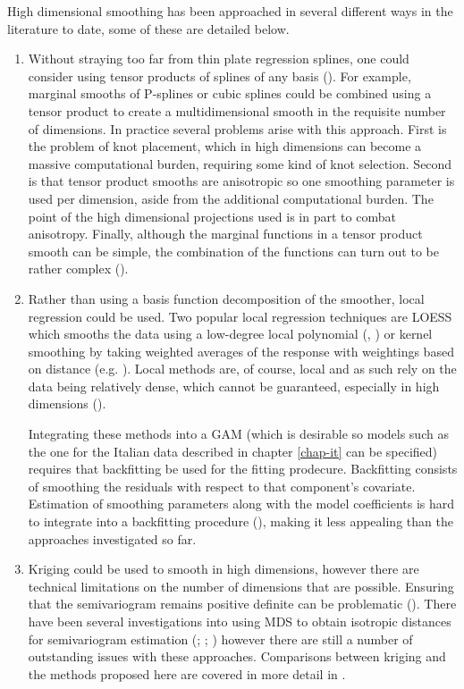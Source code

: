 High dimensional smoothing has been approached in several different ways in the literature to date, some of these are detailed below.
\begin{enumerate}
   \item Without straying too far from thin plate regression splines, one could consider using tensor products of splines of any basis (). For example, marginal smooths of P-splines or cubic splines could be combined using a tensor product to create a multidimensional smooth in the requisite number of dimensions. In practice several problems arise with this approach. First is the problem of knot placement, which in high dimensions can become \label{cor-r48}a massive computational burden, requiring some kind of knot selection. Second is that tensor product smooths are anisotropic so one smoothing parameter is used per dimension, aside from the additional computational burden\label{cor-5s1}. The point of the high dimensional projections used is in part to combat anisotropy. Finally, although the marginal functions in a tensor product smooth can be simple, the combination of the functions can turn out to be rather complex ().
   \item Rather than using a basis function decomposition of the smoother, local regression could be used. Two popular local regression techniques are LOESS which smooths the data using a low-degree local polynomial  (\cite{loess1}, \cite{loess2}) or kernel smoothing by taking weighted averages of the response with weightings based on distance (e.g. \cite[pp. 194-200]{elements}). Local methods are, of course, local and as such rely on the data being relatively dense, which cannot be guaranteed, especially in high dimensions (\cite[p. 200]{elements}). 

Integrating these methods into a GAM (which is desirable so models such as the one for the Italian data described in chapter \ref{chap-it} can be specified) requires that\label{cor-5s2} backfitting be used for the fitting prodecure. Backfitting consists of smoothing the residuals with respect to that component's covariate. \label{cor-r49}Estimation of smoothing parameters along with the model coefficients is hard to integrate into a backfitting procedure (\cite[p. 213]{simonbook}), making it less appealing than the approaches investigated so far.
   \item Kriging could be used to smooth in high dimensions, however there are technical limitations on the number of dimensions that are possible. Ensuring that the semivariogram remains positive definite can be problematic (\cite{boisvert}). There have been several investigations into using MDS to obtain isotropic distances for semivariogram estimation (\cite{curriero}; \cite{mdskrig}; \cite{crabkrig}) however there are still a number of outstanding issues with these approaches. Comparisons between kriging and the methods proposed here are covered in more detail in .
\end{enumerate}

